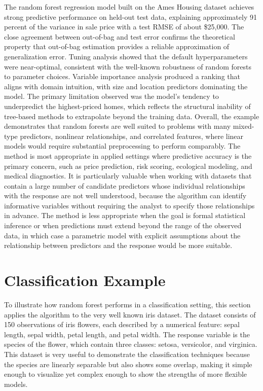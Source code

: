 \documentclass[
  11pt,
  letterpaper,
]{article}
\begin{document}
The random forest regression model built on the Ames Housing dataset
achieves strong predictive performance on held-out test data, explaining
approximately 91 percent of the variance in sale price with a test RMSE
of about \$25,000. The close agreement between out-of-bag and test error
confirms the theoretical property that out-of-bag estimation provides a
reliable approximation of generalization error. Tuning analysis showed
that the default hyperparameters were near-optimal, consistent with the
well-known robustness of random forests to parameter choices. Variable
importance analysis produced a ranking that aligns with domain
intuition, with size and location predictors dominating the model. The
primary limitation observed was the model's tendency to underpredict the
highest-priced homes, which reflects the structural inability of
tree-based methods to extrapolate beyond the training data. Overall, the
example demonstrates that random forests are well suited to problems
with many mixed-type predictors, nonlinear relationships, and correlated
features, where linear models would require substantial preprocessing to
perform comparably. The method is most appropriate in applied settings
where predictive accuracy is the primary concern, such as price
prediction, risk scoring, ecological modeling, and medical diagnostics.
It is particularly valuable when working with datasets that contain a
large number of candidate predictors whose individual relationships with
the response are not well understood, because the algorithm can identify
informative variables without requiring the analyst to specify those
relationships in advance. The method is less appropriate when the goal
is formal statistical inference or when predictions must extend beyond
the range of the observed data, in which case a parametric model with
explicit assumptions about the relationship between predictors and the
response would be more suitable.

\section{Classification Example}\label{classification-example}

To illustrate how random forest performs in a classification setting,
this section applies the algorithm to the very well known iris dataset.
The dataset consists of 150 observations of iris flowers, each described
by a numerical feature: sepal length, sepal width, petal length, and
petal width. The response variable is the species of the flower, which
contain three classes: setosa, versicolor, and virginica. This dataset
is very useful to demonstrate the classification techniques because the
species are linearly separable but also shows some overlap, making it
simple enough to visualize yet complex enough to show the strengths of
more flexible models.
\end{document}
